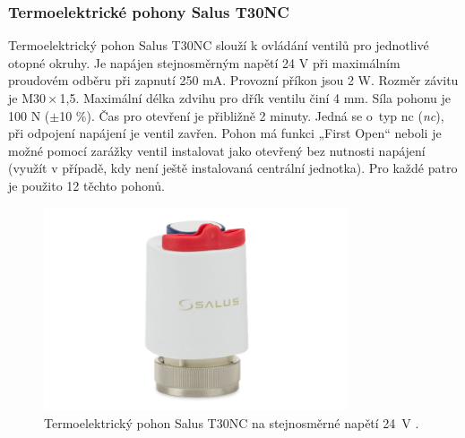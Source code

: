 \subsubsection{Termoelektrické pohony Salus T30NC}  
Termoelektrický pohon Salus T30NC slouží k ovládání ventilů pro jednotlivé otopné okruhy. Je napájen stejnosměrným napětí 24 V při maximálním proudovém odběru při zapnutí 250 mA. Provozní příkon jsou 2 W. Rozměr závitu je M30\,×\,1,5. Maximální délka zdvihu pro dřík ventilu činí 4 mm. Síla pohonu je 100 N ($\pm$10 \%). Čas pro otevření je přibližně 2 minuty. Jedná se o~typ \acrshort{nc} (\textit{\acrlong{nc}}), při odpojení napájení je ventil zavřen. Pohon má funkci „First Open“ neboli je možné pomocí zarážky ventil instalovat jako otevřený bez nutnosti napájení (využít v případě, kdy není ještě instalovaná centrální jednotka). Pro každé patro je použito 12 těchto pohonů.

\begin{figure}[H]
    \centering
    \includegraphics[width=0.8\textwidth]{images/termoelektricky-pohon-salus-t30nc-24-v.png}
    \caption[Termoelektrický pohon Salus T30NC na stejnosměrné napětí 24 V.]{Termoelektrický pohon Salus T30NC na stejnosměrné napětí 24~V \cite{termoelektricky-pohon-t30nc}.}
    \label{fig:termoelektricky-pohon-salus-t30nc-24-v}
\end{figure}